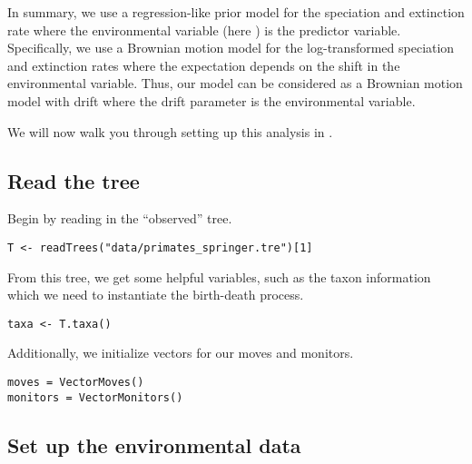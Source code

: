 In summary, we use a regression-like prior model for the speciation and extinction rate where the environmental variable (here \COO) is the predictor variable.
Specifically, we use a Brownian motion model for the log-transformed speciation and extinction rates where the expectation depends on the shift in the environmental variable.
Thus, our model can be considered as a Brownian motion model with drift where the drift parameter is the environmental variable.

We will now walk you through setting up this analysis in \RevBayes.

\subsection{Read the tree}

Begin by reading in the ``observed'' tree. 
{\tt \begin{snugshade*}
\begin{lstlisting}
T <- readTrees("data/primates_springer.tre")[1]
\end{lstlisting}
\end{snugshade*}}

From this tree, we get some helpful variables, such as the taxon information which we need to instantiate the birth-death process.
{\tt \begin{snugshade*}
\begin{lstlisting}
taxa <- T.taxa()
\end{lstlisting}
\end{snugshade*}}

Additionally, we initialize vectors for our moves and monitors.
{\tt \begin{snugshade*}
\begin{lstlisting}
moves = VectorMoves()
monitors = VectorMonitors()
\end{lstlisting}
\end{snugshade*}}



\subsection{Set up the environmental data}

